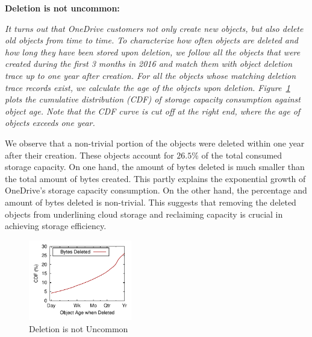 {\bf Deletion is not uncommon:} {\em It turns out that OneDrive customers not only create new objects, but also delete old objects from time to time. To characterize how often objects are deleted and how long they have been stored upon deletion, we follow all the objects that were created during the first 3 months in 2016 and match them with object deletion trace up to one year after creation. For all the objects whose matching deletion trace records exist, we calculate the age of the objects upon deletion. Figure~\ref{fig:deletion} plots the cumulative distribution (CDF) of storage capacity consumption against object age. Note that the CDF curve is cut off at the right end, where the age of objects exceeds one year.

We observe that a non-trivial portion of the objects were deleted within one year after their creation. These objects account for $26.5\%$ of the total consumed storage capacity. On one hand, the amount of bytes deleted is much smaller than the total amount of bytes created. This partly explains the exponential growth of OneDrive's storage capacity consumption. On the other hand, the percentage and amount of bytes deleted is non-trivial. This suggests that removing the deleted objects from underlining cloud storage and reclaiming capacity is crucial in achieving storage efficiency.}

\begin{figure}[tp]
\centering
\includegraphics[width=0.4\textwidth]{data/age-bytes}
\caption{Deletion is not Uncommon}
\label{fig:deletion}
\end{figure}

